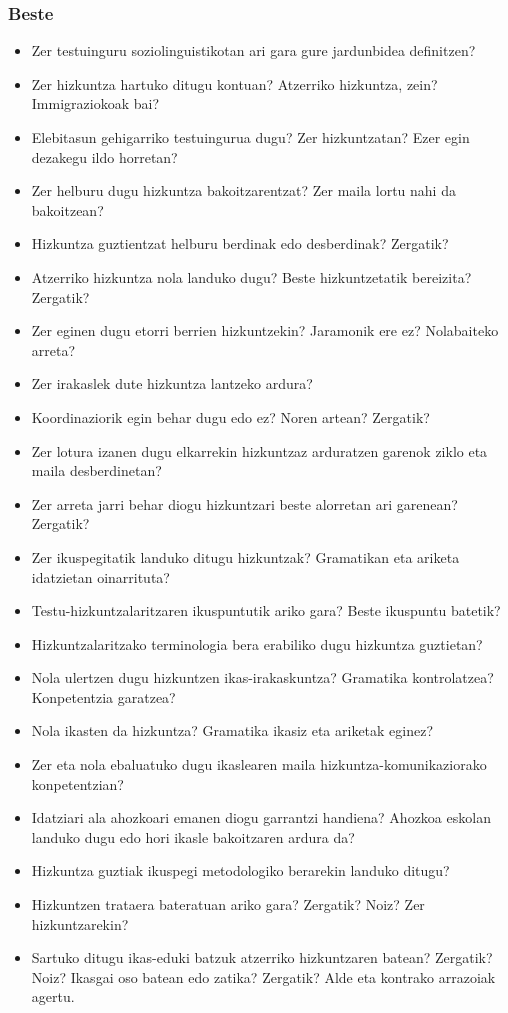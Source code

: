 \documentclass[
]{book}
\providecommand{\tightlist}{%
  \setlength{\itemsep}{0pt}\setlength{\parskip}{0pt}}
\begin{document}
\hypertarget{beste-1}{%
\subsubsection*{Beste}\label{beste-1}}

\begin{itemize}
\tightlist
\item
  Zer testuinguru soziolinguistikotan ari gara gure jardunbidea definitzen?
\item
  Zer hizkuntza hartuko ditugu kontuan? Atzerriko hizkuntza, zein? Immigraziokoak bai?
\item
  Elebitasun gehigarriko testuingurua dugu? Zer hizkuntzatan? Ezer egin dezakegu ildo horretan?
\item
  Zer helburu dugu hizkuntza bakoitzarentzat? Zer maila lortu nahi da bakoitzean?
\item
  Hizkuntza guztientzat helburu berdinak edo desberdinak? Zergatik?
\item
  Atzerriko hizkuntza nola landuko dugu? Beste hizkuntzetatik bereizita? Zergatik?
\item
  Zer eginen dugu etorri berrien hizkuntzekin? Jaramonik ere ez? Nolabaiteko arreta?
\item
  Zer irakaslek dute hizkuntza lantzeko ardura?
\item
  Koordinaziorik egin behar dugu edo ez? Noren artean? Zergatik?
\item
  Zer lotura izanen dugu elkarrekin hizkuntzaz arduratzen garenok ziklo eta maila desberdinetan?
\item
  Zer arreta jarri behar diogu hizkuntzari beste alorretan ari garenean? Zergatik?
\item
  Zer ikuspegitatik landuko ditugu hizkuntzak? Gramatikan eta ariketa idatzietan oinarrituta?
\item
  Testu-hizkuntzalaritzaren ikuspuntutik ariko gara? Beste ikuspuntu batetik?
\item
  Hizkuntzalaritzako terminologia bera erabiliko dugu hizkuntza guztietan?
\item
  Nola ulertzen dugu hizkuntzen ikas-irakaskuntza? Gramatika kontrolatzea? Konpetentzia garatzea?
\item
  Nola ikasten da hizkuntza? Gramatika ikasiz eta ariketak eginez?
\item
  Zer eta nola ebaluatuko dugu ikaslearen maila hizkuntza-komunikaziorako konpetentzian?
\item
  Idatziari ala ahozkoari emanen diogu garrantzi handiena? Ahozkoa eskolan landuko dugu edo hori ikasle bakoitzaren ardura da?
\item
  Hizkuntza guztiak ikuspegi metodologiko berarekin landuko ditugu?
\item
  Hizkuntzen trataera bateratuan ariko gara? Zergatik? Noiz? Zer hizkuntzarekin?
\item
  Sartuko ditugu ikas-eduki batzuk atzerriko hizkuntzaren batean? Zergatik? Noiz? Ikasgai oso batean edo zatika? Zergatik? Alde eta kontrako arrazoiak agertu.
\end{itemize}
\end{document}
